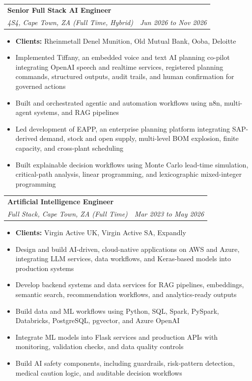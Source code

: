 \documentclass[letterpaper,11pt]{article}
\makeatletter
\newcommand{\resumeItem}[1]{
  \item\small{
    {#1 \vspace{-1pt}}
  }
}
\newcommand{\resumeSubheading}[4]{
  \vspace{-2pt}\item
    \begin{tabular*}{1.0\textwidth}[t]{l@{\extracolsep{\fill}}r}
      \textbf{\large#1} & \textbf{\small #2} \\
      \textit{\large#3} & \textit{\small #4} \\

    \end{tabular*}\vspace{-7pt}
}
\newcommand{\resumeItemListStart}{\begin{itemize}[leftmargin=0.1in]}
\newcommand{\resumeItemListEnd}{\end{itemize}\vspace{-5pt}}
\makeatother
\begin{document}
    \resumeSubheading
      {Senior Full Stack AI Engineer}{}
      {4S4, Cape Town, ZA (Full Time, Hybrid)}{Jun 2026 to Nov 2026}
      \resumeItemListStart
            \resumeItem{\small{\textbf{Clients:} Rheinmetall Denel Munition, Old Mutual Bank, Ooba, Deloitte}}
            \resumeItem{\small{Implemented Tiffany, an embedded voice and text AI planning co-pilot integrating OpenAI speech and realtime services, registered planning commands, structured outputs, audit trails, and human confirmation for governed actions}}
            \resumeItem{\small{Built and orchestrated agentic and automation workflows using n8n, multi-agent systems, and RAG pipelines}}
            \resumeItem{\small{Led development of EAPP, an enterprise planning platform integrating SAP-derived demand, stock and open supply, multi-level BOM explosion, finite capacity, and cross-plant scheduling}}
            \resumeItem{\small{Built explainable decision workflows using Monte Carlo lead-time simulation, critical-path analysis, linear programming, and lexicographic mixed-integer programming}}
      \resumeItemListEnd
      \vspace{4pt}

    \resumeSubheading
      {Artificial Intelligence Engineer}{}
      {Full Stack, Cape Town, ZA (Full Time)}{Mar 2023 to May 2026}
      \resumeItemListStart
            \resumeItem{\small{\textbf{Clients:} Virgin Active UK, Virgin Active SA, Expandly}}
            \resumeItem{\small{Design and build AI-driven, cloud-native applications on AWS and Azure, integrating LLM services, data workflows, and Keras-based models into production systems}}
            \resumeItem{\small{Develop backend systems and data services for RAG pipelines, embeddings, semantic search, recommendation workflows, and analytics-ready outputs}}
            \resumeItem{\small{Build data and ML workflows using Python, SQL, Spark, PySpark, Databricks, PostgreSQL, pgvector, and Azure OpenAI}}
            \resumeItem{\small{Integrate ML models into Flask services and production APIs with monitoring, validation checks, and data quality controls}}
            \resumeItem{\small{Build AI safety components, including guardrails, risk-pattern detection, medical caution logic, and auditable decision workflows}}
      \resumeItemListEnd
      \vspace{4pt}
\end{document}
